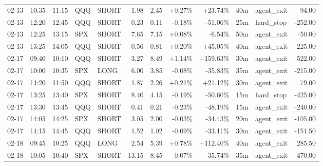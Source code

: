 \documentclass[11pt,a4paper,twoside]{article}
\begin{document}
\begin{center}
\begin{longtable}{>{\color{txtmain}}l l l l l r r r r r >{\color{txtmain}}l r}
02-13 & 10:35 & 11:15 & QQQ & SHORT & 1.98 & 2.45 & \textcolor{wingreen}{+0.27\%} & \textcolor{wingreen}{+23.74\%} & 40m & agent\_exit & \textcolor{wingreen}{94.00} \\
02-13 & 12:20 & 12:45 & QQQ & SHORT & 0.23 & 0.11 & \textcolor{lossred}{-0.18\%} & \textcolor{lossred}{-51.06\%} & 25m & hard\_stop & \textcolor{lossred}{-252.00} \\
02-13 & 12:25 & 13:15 & SPX & SHORT & 7.65 & 7.15 & \textcolor{wingreen}{+0.08\%} & \textcolor{lossred}{-6.54\%} & 50m & agent\_exit & \textcolor{lossred}{-50.00} \\
02-13 & 13:25 & 14:05 & QQQ & SHORT & 0.56 & 0.81 & \textcolor{wingreen}{+0.20\%} & \textcolor{wingreen}{+45.05\%} & 40m & agent\_exit & \textcolor{wingreen}{225.00} \\
02-17 & 09:40 & 10:10 & QQQ & SHORT & 3.27 & 8.49 & \textcolor{wingreen}{+1.14\%} & \textcolor{wingreen}{+159.63\%} & 30m & agent\_exit & \textcolor{wingreen}{522.00} \\
02-17 & 10:00 & 10:35 & SPX & LONG & 6.00 & 3.85 & \textcolor{lossred}{-0.08\%} & \textcolor{lossred}{-35.83\%} & 35m & agent\_exit & \textcolor{lossred}{-215.00} \\
02-17 & 11:20 & 11:50 & QQQ & SHORT & 1.87 & 2.26 & \textcolor{wingreen}{+0.21\%} & \textcolor{wingreen}{+21.12\%} & 30m & agent\_exit & \textcolor{wingreen}{79.00} \\
02-17 & 13:25 & 13:40 & SPX & SHORT & 8.40 & 4.15 & \textcolor{lossred}{-0.19\%} & \textcolor{lossred}{-50.60\%} & 15m & hard\_stop & \textcolor{lossred}{-425.00} \\
02-17 & 13:30 & 13:45 & QQQ & SHORT & 0.41 & 0.21 & \textcolor{lossred}{-0.23\%} & \textcolor{lossred}{-48.19\%} & 15m & agent\_exit & \textcolor{lossred}{-240.00} \\
02-17 & 14:05 & 14:25 & SPX & SHORT & 3.05 & 2.00 & \textcolor{lossred}{-0.03\%} & \textcolor{lossred}{-34.43\%} & 20m & agent\_exit & \textcolor{lossred}{-105.00} \\
02-17 & 14:15 & 14:45 & QQQ & SHORT & 1.52 & 1.02 & \textcolor{lossred}{-0.09\%} & \textcolor{lossred}{-33.11\%} & 30m & agent\_exit & \textcolor{lossred}{-151.50} \\
02-18 & 09:45 & 10:25 & QQQ & LONG & 2.54 & 5.39 & \textcolor{wingreen}{+0.78\%} & \textcolor{wingreen}{+112.40\%} & 40m & agent\_exit & \textcolor{wingreen}{285.50} \\
02-18 & 10:05 & 10:40 & SPX & SHORT & 13.15 & 8.45 & \textcolor{lossred}{-0.07\%} & \textcolor{lossred}{-35.74\%} & 35m & agent\_exit & \textcolor{lossred}{-470.00} \\

\end{longtable}
\end{center}
\end{document}
